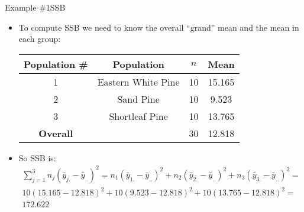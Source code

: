 \documentclass[xcolor=dvipsnames]{beamer}
\begin{document}
\begin{frame}{Example \#1}{SSB}
	\begin{itemize}
		\item To compute SSB we need to know the overall ``grand'' mean and the mean in each group:
		\begin{center}
			\begin{tabular}{|c|c|c|c|}
				\hline
				\textbf{Population \#} & \textbf{Population} & $n$ & \textbf{Mean} \\
				\hline \hline
				1  & Eastern White Pine    &   10 &  15.165 \\ \hline 
				2 &  Sand Pine              & 10 &    9.523\\ \hline 
				3 &  Shortleaf Pine        &  10 &   13.765\\ \hline \hline
				\textbf{Overall} & & 30 & 12.818 \\ \hline
			\end{tabular}
		\end{center}
				\vspace{2mm}
		\item So SSB is:
		\begin{gather*}
		\sum_{j=1}^3 n_j (\bar{y}_{j.} - \bar{y}_{..})^2 = n_1 (\bar{y}_{1.}-\bar{y}_{..})^2 + n_2 (\bar{y}_{2.}-\bar{y}_{..})^2 + n_3 (\bar{y}_{3.}-\bar{y}_{..})^2 =  \\
		 10(15.165 - 12.818)^2 + 10(9.523-12.818)^2 + 10(13.765-12.818)^2 =\\
		 172.622
		\end{gather*}
	\end{itemize}
\end{frame}
\end{document}
